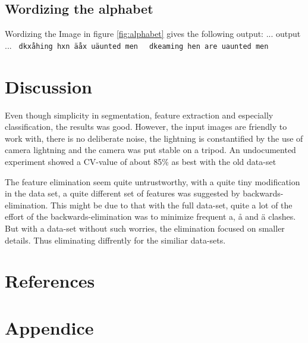 \documentclass[a4paper,11pt]{article}
\begin{document}
\subsection{Wordizing the alphabet}
Wordizing the Image in figure \ref{fig:alphabet} gives the following output:
... output ...
\texttt{
dkxåhing
hxn äåx
uäunted
men
}
\texttt{
dkeaming
hen are
uaunted
men
}








\section{Discussion}

Even though simplicity in segmentation, feature extraction and especially classification, the results was good.
However, the input images are friendly to work with,
there is no deliberate noise, the lightning is constantified by the use of camera lightning and the camera was put stable on a tripod.
An undocumented experiment showed a CV-value of about 85\% as best with the old data-set 

The feature elimination seem quite untrustworthy,
with a quite tiny modification in the data set,
a quite different set of features was suggested by backwards-elimination.
This might be due to that with the full data-set,
quite a lot of the effort of the backwards-elimination was to minimize frequent a, å and ä clashes.
But with a data-set without such worries, the elimination focused on smaller details.
Thus eliminating diffrently for the similiar data-sets.

\section{References}
\section{Appendice}
\end{document}
